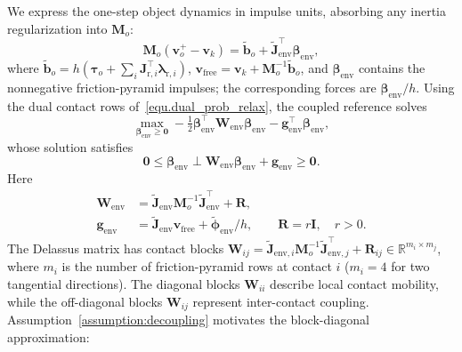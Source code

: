 We express the one-step object dynamics in impulse units, absorbing any inertia regularization into $\boldsymbol{M}_o$:
\begin{equation}
\boldsymbol{M}_o(\boldsymbol{v}_o^+-\boldsymbol{v}_k)
=\boldsymbol{\tilde b}_o+
\boldsymbol{\tilde J}_{\mathrm{env}}^\top\boldsymbol{\beta}_{\mathrm{env}},
\label{eq:simplified}
\end{equation}
where $\boldsymbol{\tilde b}_o=h(\boldsymbol{\tau}_o+\sum_i\boldsymbol{J}_{\mathrm r,i}^\top\boldsymbol{\lambda}_{\mathrm r,i})$, $\boldsymbol{v}_{\mathrm{free}}=\boldsymbol{v}_k+\boldsymbol{M}_o^{-1}\boldsymbol{\tilde b}_o$, and $\boldsymbol{\beta}_{\mathrm{env}}$ contains the nonnegative friction-pyramid impulses; the corresponding forces are $\boldsymbol{\beta}_{\mathrm{env}}/h$. Using the dual contact rows of~\eqref{equ.dual_prob_relax}, the coupled reference solves
\begin{equation}
\max_{\boldsymbol{\beta}_{\mathrm{env}}\geq\boldsymbol{0}}
-\tfrac12\boldsymbol{\beta}_{\mathrm{env}}^\top
\boldsymbol{W}_{\mathrm{env}}\boldsymbol{\beta}_{\mathrm{env}}
-\boldsymbol{g}_{\mathrm{env}}^\top\boldsymbol{\beta}_{\mathrm{env}},
\label{eq:dual_problem}
\end{equation}
whose solution satisfies
\begin{equation}
\boldsymbol{0}\leq\boldsymbol{\beta}_{\mathrm{env}}\perp
\boldsymbol{W}_{\mathrm{env}}\boldsymbol{\beta}_{\mathrm{env}}
+\boldsymbol{g}_{\mathrm{env}}\geq\boldsymbol{0}.
\label{eq:env_complementarity}
\end{equation}
Here
\begin{equation}
\begin{aligned}
\boldsymbol{W}_{\mathrm{env}}
&=\boldsymbol{\tilde J}_{\mathrm{env}}\boldsymbol{M}_o^{-1}
\boldsymbol{\tilde J}_{\mathrm{env}}^\top+\boldsymbol{R},\\
\boldsymbol{g}_{\mathrm{env}}
&=\boldsymbol{\tilde J}_{\mathrm{env}}\boldsymbol{v}_{\mathrm{free}}
+\boldsymbol{\tilde\phi}_{\mathrm{env}}/h,
\qquad\boldsymbol{R}=r\boldsymbol{I},\quad r>0.
\end{aligned}
\end{equation}
The Delassus matrix has contact blocks $\boldsymbol{W}_{ij}=\boldsymbol{\tilde J}_{\mathrm{env},i}\boldsymbol{M}_o^{-1}\boldsymbol{\tilde J}_{\mathrm{env},j}^{\top}+\boldsymbol{R}_{ij}\in\mathbb R^{m_i\times m_j}$, where $m_i$ is the number of friction-pyramid rows at contact $i$ ($m_i=4$ for two tangential directions).
The diagonal blocks $\boldsymbol{W}_{ii}$ describe local contact mobility, while the off-diagonal blocks $\boldsymbol{W}_{ij}$ represent inter-contact coupling. Assumption~\ref{assumption:decoupling} motivates the block-diagonal approximation:
